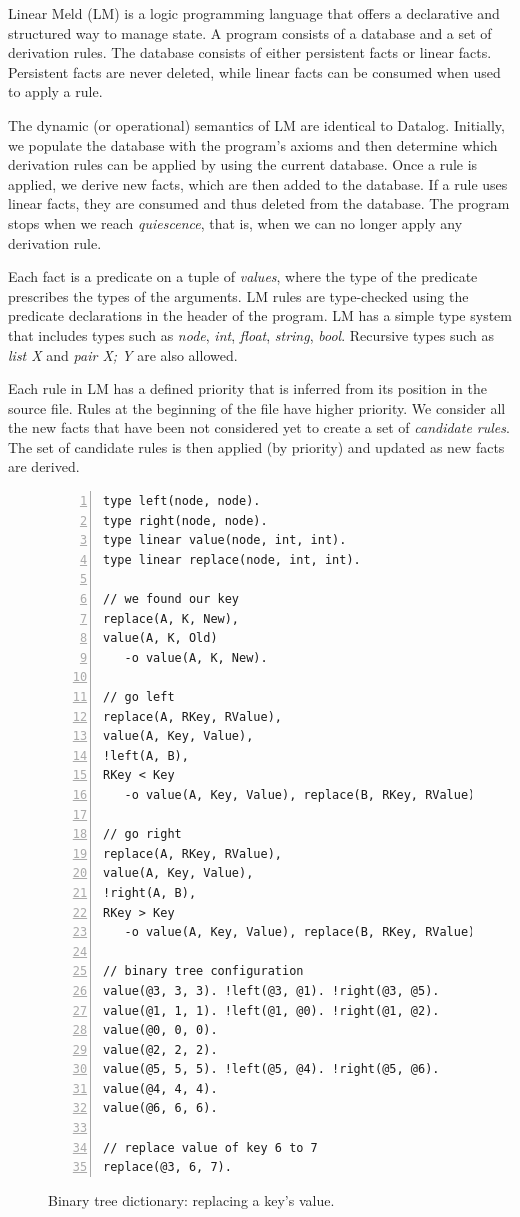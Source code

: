 \newcommand{\selector}[0]{[~S~\Rightarrow~y;~BE~] \lolli HE}
\newcommand{\comprehension}[0]{\{~\widehat{x};~BE;~SH~\}}
\newcommand{\aggregate}[0]{[~A~\Rightarrow~y;~\widehat{x};~BE;~SH_1;~SH_2~]}

Linear Meld (LM) is a logic programming language that offers a declarative and structured way to manage state.
A program consists of a database and a set of derivation rules. The database consists of either persistent facts
or linear facts. Persistent facts are never deleted, while linear facts can be consumed when used to apply a rule.

The dynamic (or operational) semantics of LM are identical to Datalog.
Initially, we populate the database with the program's axioms and then determine which derivation rules can be
applied by using the current database. Once a rule is applied, we derive new facts, which are then added to the database.
If a rule uses linear facts, they are consumed and thus deleted from the database.
The program stops when we reach \emph{quiescence}, that is, when we can no longer apply any derivation rule.

Each fact is a predicate on a tuple of \emph{values}, where the type of the predicate prescribes the types of the arguments.
LM rules are type-checked using the predicate declarations in the header of the program. LM has a simple type system that includes types such as
\emph{node}, \emph{int}, \emph{float}, \emph{string}, \emph{bool}. Recursive types such as \emph{list X} and \emph{pair X; Y} are
also allowed.

Each rule in LM has a defined priority that is inferred from its position in the source file.
Rules at the beginning of the file have higher priority. We consider all
the new facts that have been not considered yet to create a set of \emph{candidate rules}.
The set of candidate rules is then applied (by priority) and updated as new facts are derived.

\begin{figure}[h]
\small\begin{Verbatim}[numbers=left]
type left(node, node).
type right(node, node).
type linear value(node, int, int).
type linear replace(node, int, int).

// we found our key
replace(A, K, New),
value(A, K, Old)
   -o value(A, K, New).

// go left
replace(A, RKey, RValue),
value(A, Key, Value),
!left(A, B),
RKey < Key
   -o value(A, Key, Value), replace(B, RKey, RValue).

// go right
replace(A, RKey, RValue),
value(A, Key, Value),
!right(A, B),
RKey > Key
   -o value(A, Key, Value), replace(B, RKey, RValue).

// binary tree configuration
value(@3, 3, 3). !left(@3, @1). !right(@3, @5).
value(@1, 1, 1). !left(@1, @0). !right(@1, @2).
value(@0, 0, 0).
value(@2, 2, 2).
value(@5, 5, 5). !left(@5, @4). !right(@5, @6).
value(@4, 4, 4).
value(@6, 6, 6).

// replace value of key 6 to 7
replace(@3, 6, 7).
\end{Verbatim}
\caption{Binary tree dictionary: replacing a key's value.}
  \label{code:btree_replace}
\end{figure}

